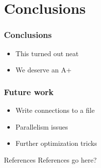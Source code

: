 \documentclass{beamer}
\begin{document}
\section{Conclusions}

\begin{frame}
  \frametitle{Conclusions}
  \begin{itemize}
	 \item This turned out neat
	 \item We deserve an A+
  \end{itemize}
\end{frame}

\begin{frame}
  \frametitle{Future work}
  \begin{itemize}
	 \item Write connections to a file
	 \item Parallelism issues
   \item Further optimization tricks
  \end{itemize}
\end{frame}

\appendix
\begin{frame}{References}
  References go here?
\end{frame}
\end{document}
